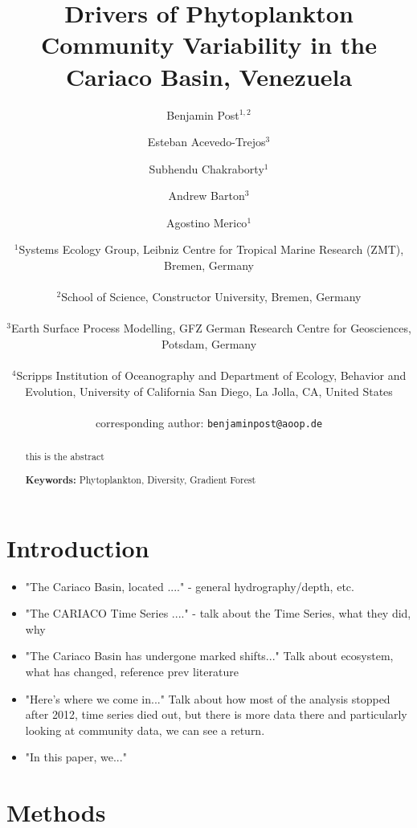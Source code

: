 \documentclass[a4paper]{article}
\title{Drivers of Phytoplankton Community Variability in the Cariaco Basin, Venezuela}
\author{Benjamin Post$^{1,2}$ \and Esteban Acevedo-Trejos$^3$ \and Subhendu Chakraborty$^1$ \and Andrew Barton$^3$ \and Agostino Merico$^1$}
\date{
	$^1$Systems Ecology Group, Leibniz Centre for Tropical Marine Research (ZMT), Bremen, Germany \\ \\%
        $^2$School of Science, Constructor University, Bremen, Germany \\ \\%
	$^3$Earth Surface Process Modelling, GFZ German Research Centre for Geosciences, Potsdam, Germany\\ \\%
	$^4$Scripps Institution of Oceanography and Department of Ecology, Behavior and Evolution, University of California San Diego, La Jolla, CA, United States \\ \\[2ex]%
corresponding author: \texttt{benjaminpost@aoop.de}
}
\begin{document}
    \maketitle
    
    \begin{abstract}
        this is the abstract
    
        
        \noindent\textbf{Keywords:} Phytoplankton, Diversity, Gradient Forest
    \end{abstract}
    
    \tableofcontents
    
    \section{Introduction}
    \label{sec:intro}
    
        \begin{itemize}

            
            \item "The Cariaco Basin, located ...." - general hydrography/depth, etc.

            \item "The CARIACO Time Series ...." - talk about the Time Series, what they did, why

            \item "The Cariaco Basin has undergone marked shifts..." Talk about ecosystem, what has changed, reference prev literature

            \item "Here's where we come in..." Talk about how most of the analysis stopped after 2012, time series died out, but there is more data there and particularly looking at community data, we can see a return.

            \item "In this paper, we..." 
            
        \end{itemize}
    
    \section{Methods}
    \label{sec:methods}
        
\end{document}

